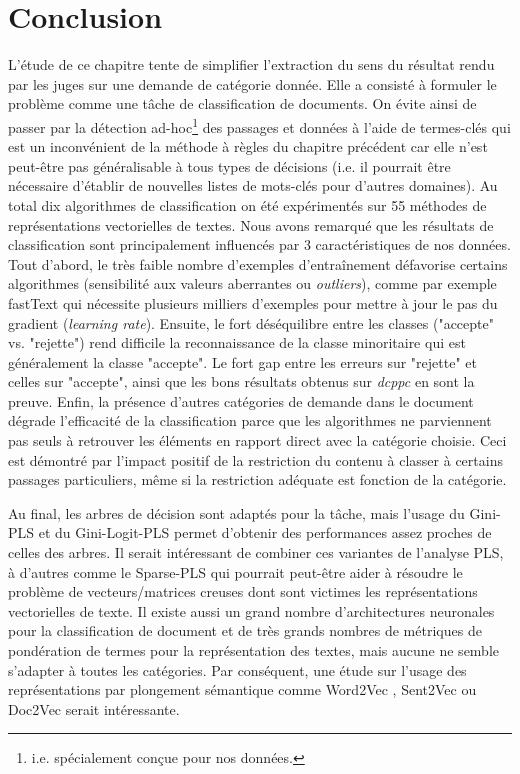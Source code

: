 \section{Conclusion}
\label{sec:sensresultat:conclusion}
L'étude de ce chapitre tente de simplifier l'extraction du sens du résultat rendu par les juges sur une demande de catégorie donnée. Elle a consisté à formuler le problème comme une tâche de classification de documents. On évite ainsi de passer par la détection ad-hoc\footnote{i.e. spécialement conçue pour nos données.} des passages et données à l'aide de termes-clés qui est un inconvénient de la méthode à règles du chapitre précédent car elle n'est peut-être pas généralisable à tous types de décisions (i.e. il pourrait être nécessaire d'établir de nouvelles listes de mots-clés pour d'autres domaines). Au total dix algorithmes de classification on été expérimentés sur 55 méthodes de représentations vectorielles de textes. Nous avons remarqué que les résultats de classification sont principalement influencés par 3 caractéristiques de nos données. Tout d'abord, le très faible nombre d'exemples d'entraînement défavorise certains algorithmes (sensibilité aux valeurs aberrantes ou \textit{outliers}), comme par exemple fastText qui nécessite plusieurs milliers d'exemples pour mettre à jour le pas du gradient (\textit{learning rate}). Ensuite, le fort déséquilibre entre les classes ("accepte" vs. "rejette") rend difficile la reconnaissance de la classe minoritaire qui est généralement la classe "accepte". Le fort gap entre les erreurs sur "rejette" et celles sur "accepte", ainsi que les bons résultats obtenus sur \textit{dcppc} en sont la preuve. Enfin, la présence d'autres catégories de demande dans le document dégrade l'efficacité de la classification parce que les algorithmes ne parviennent pas seuls à retrouver les éléments en rapport direct avec la catégorie choisie. Ceci est démontré par l'impact positif de la restriction du contenu à classer à certains passages particuliers, même si la restriction adéquate est fonction de la catégorie.
 
Au final, les arbres de décision sont adaptés pour la tâche, mais l'usage du Gini-PLS et du Gini-Logit-PLS permet d'obtenir des performances assez proches de celles des arbres. %
Il serait intéressant de combiner ces variantes de l'analyse PLS, à d'autres comme le Sparse-PLS qui pourrait peut-être aider à résoudre le problème de vecteurs/matrices creuses dont sont victimes les représentations vectorielles de texte. Il existe aussi un grand nombre d'architectures neuronales pour la classification de document et de très grands nombres de métriques de pondération de termes pour la représentation des textes, mais aucune ne semble s'adapter à toutes les catégories. Par conséquent, une étude sur l'usage des représentations par plongement sémantique comme Word2Vec \citep{mikolov2013word2vec}, Sent2Vec \citep{pagliardini2017sent2vec} ou Doc2Vec \citep{quoc2014doc2vec} serait intéressante.
